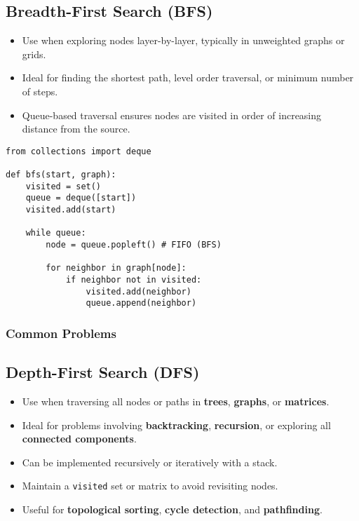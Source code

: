 \subsection{Breadth-First Search (BFS)}
\begin{summary}
    \begin{itemize}
        \item Use when exploring nodes layer-by-layer, typically in unweighted graphs or grids.
        \item Ideal for finding the shortest path, level order traversal, or minimum number of steps.
        \item Queue-based traversal ensures nodes are visited in order of increasing distance from the source.
    \end{itemize}
\end{summary}

\begin{algo}
\begin{lstlisting}
from collections import deque

def bfs(start, graph):
    visited = set()
    queue = deque([start])
    visited.add(start)

    while queue:
        node = queue.popleft() # FIFO (BFS)

        for neighbor in graph[node]:
            if neighbor not in visited:
                visited.add(neighbor)
                queue.append(neighbor)
\end{lstlisting}
\end{algo}
\newpage

\subsubsection{Common Problems}
\begin{summary}
\end{summary}
\newpage

\subsection{Depth-First Search (DFS)}

\begin{summary}
    \begin{itemize}
        \item Use when traversing all nodes or paths in \textbf{trees}, \textbf{graphs}, or \textbf{matrices}.
        \item Ideal for problems involving \textbf{backtracking}, \textbf{recursion}, or exploring all \textbf{connected components}.
        \item Can be implemented recursively or iteratively with a stack.
        \item Maintain a \texttt{visited} set or matrix to avoid revisiting nodes.
        \item Useful for \textbf{topological sorting}, \textbf{cycle detection}, and \textbf{pathfinding}.
    \end{itemize}
\end{summary}

